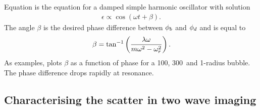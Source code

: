 Equation  is the equation for a damped simple harmonic oscillator with solution
\begin{align}
\epsilon \propto \cos(\omega t + \beta). \label{eqn:SHO_soln}
\end{align}
The angle $\beta$ is the desired phase difference between ${\phi_b}$ and ${\phi_d}$ and is equal to 
\begin{align}
\beta = \tan^{-1}\left( \frac{\lambda \omega}{m \omega^2-\omega_r^2} \right).
\end{align}
As examples,  plots $\beta$ as a function of phase for a \unit{100}\nano\metre, \unit{300}\nano\metre\  and \unit{1}\micro\metre-radius bubble.
The phase difference drops rapidly at resonance.




\subsection{Characterising the scatter in two wave imaging}\label{sec:comp:optimum}

